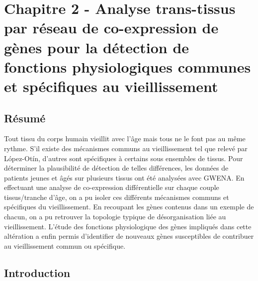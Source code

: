 \chapter{Chapitre 2 - Analyse trans-tissus par réseau de co-expression de gènes pour la détection de fonctions physiologiques communes et spécifiques au vieillissement}
\label{chapter:multidim}

\section{Résumé}

Tout tissu du corps humain vieillit avec l'âge mais tous ne le font pas au même rythme. S'il existe des mécanismes communs au vieillissement tel que relevé par López-Otín, d'autres sont spécifiques à certains sous ensembles de tissus. Pour déterminer la plausibilité de détection de telles différences, les données de patients jeunes et âgés sur plusieurs tissus ont été analysées avec GWENA. En effectuant une analyse de co-expression différentielle sur chaque couple tissus/tranche d'âge, on a pu isoler ces différents mécanismes communs et spécifiques du vieillissement. En recoupant les gènes contenus dans un exemple de chacun, on a pu retrouver la topologie typique de désorganisation liée au vieillissement. L'étude des fonctions physiologique des gènes impliqués dans cette altération a enfin permis d'identifier de nouveaux gènes susceptibles de contribuer au vieillissement commun ou spécifique. 


\section{Introduction}

